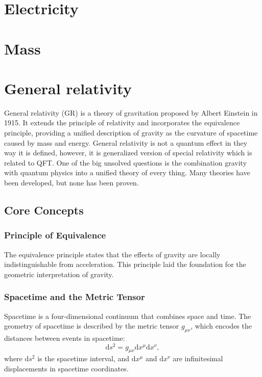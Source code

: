 



\section{Electricity}

\section{Mass}

\section{General relativity}
General relativity (GR) is a theory of gravitation proposed by Albert Einstein in 1915. It extends the principle of relativity and incorporates the equivalence principle, providing a unified description of gravity as the curvature of spacetime caused by mass and energy.
General relativity is not a quantum effect in they way it is defined, however, it is generalized version of special relativity which is related to QFT.
One of the big unsolved questions is the combination gravity with quantum physics into a unified theory of 
every thing. Many theories have been developed, but none has been proven. 


\subsection{Core Concepts}

\subsubsection{Principle of Equivalence}
The equivalence principle states that the effects of gravity are locally indistinguishable from acceleration. This principle laid the foundation for the geometric interpretation of gravity.

\subsubsection{Spacetime and the Metric Tensor}
Spacetime is a four-dimensional continuum that combines space and time. The geometry of spacetime is described by the metric tensor $g_{\mu \nu}$, which encodes the distances between events in spacetime:
\[
\mathrm{d}s^2 = g_{\mu \nu} \mathrm{d}x^{\mu} \mathrm{d}x^{\nu},
\]
where $\mathrm{d}s^2$ is the spacetime interval, and $\mathrm{d}x^{\mu}$ and $\mathrm{d}x^{\nu}$ are infinitesimal displacements in spacetime coordinates.

